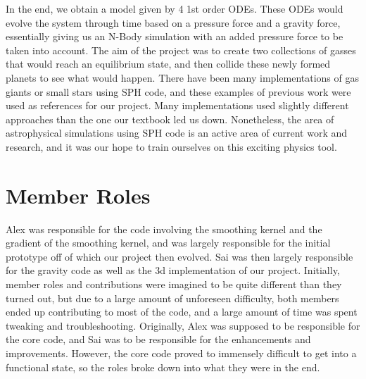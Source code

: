 \documentclass[12pt]{article}
\begin{document}
\newline\indent
In the end, we obtain a model given by 4 1st order ODEs. These ODEs would evolve the system through time based on a pressure force and a gravity force, essentially giving us an N-Body simulation with an added pressure force to be taken into account. The aim of the project was to create two collections of gasses that would reach an equilibrium state, and then collide these newly formed planets to see what would happen. There have been many implementations of gas giants or small stars using SPH code, and these examples of previous work were used as references for our project. Many implementations used slightly different approaches than the one our textbook led us down. Nonetheless, the area of astrophysical simulations using SPH code is an active area of current work and research, and it was our hope to train ourselves on this exciting physics tool.

\section{Member Roles}
Alex was responsible for the code involving the smoothing kernel and the gradient of the smoothing kernel, and was largely responsible for the initial prototype off of which our project then evolved. Sai was then largely responsible for the gravity code as well as the 3d implementation of our project. Initially, member roles and contributions were imagined to be quite different than they turned out, but due to a large amount of unforeseen difficulty, both members ended up contributing to most of the code, and a large amount of time was spent tweaking and troubleshooting. Originally, Alex was supposed to be responsible for the core code, and Sai was to be responsible for the enhancements and improvements. However, the core code proved to immensely difficult to get into a functional state, so the roles broke down into what they were in the end. 
\end{document}
